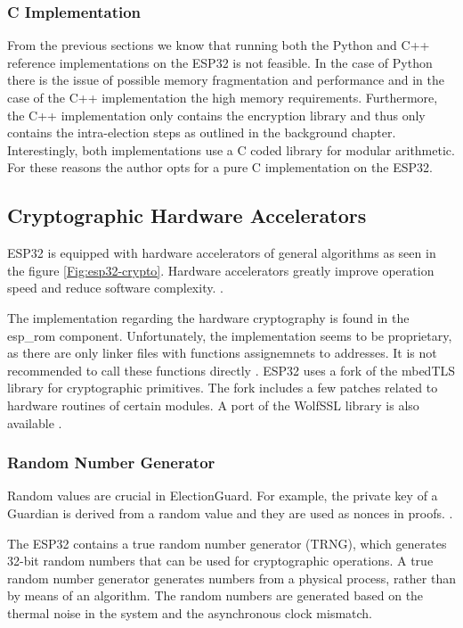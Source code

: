\subsubsection{C Implementation}
From the previous sections we know that running both the Python and C++ reference implementations on the ESP32 is not feasible. In the case of Python there is the issue of possible memory fragmentation and performance and in the case of the C++ implementation the high memory requirements. Furthermore, the C++ implementation only contains the encryption library and thus only contains the intra-election steps as outlined in the background chapter. Interestingly, both implementations use a C coded library for modular arithmetic. For these reasons the author opts for a pure C implementation on the ESP32. 

\subsection{Cryptographic Hardware Accelerators}
ESP32 is equipped with hardware accelerators of general algorithms as seen in the figure \ref{Fig:esp32-crypto}. Hardware accelerators greatly improve operation speed and reduce software complexity. \cite[32]{esp32-series}.

The implementation regarding the hardware cryptography is found in the esp\_rom component. Unfortunately, the implementation seems to be proprietary, as there are only linker files with functions assignemnets to addresses. It is not recommended to call these functions directly \cite{esp-rom}. ESP32 uses a fork of the mbedTLS library for cryptographic primitives. The fork includes a few patches related to hardware routines of certain modules. A port of the WolfSSL library is also available \cite{esp32-ref}.

\subsubsection{Random Number Generator}

Random values are crucial in ElectionGuard. For example, the private key of a Guardian is derived from a random value and they are used as nonces in proofs. \cite[9, 13]{eg-spec}.

The ESP32 contains a true random number generator (TRNG), which generates 32-bit random numbers that can be used for cryptographic operations. A true random number generator generates numbers from a physical process, rather than by means of an algorithm. The random numbers are generated based on the thermal noise in the system and the asynchronous clock mismatch. \cite[604]{esp32-ref}

